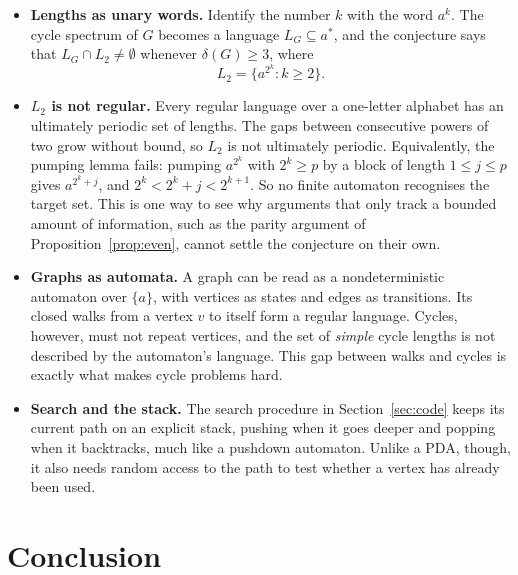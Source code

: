 \documentclass[11pt,a4paper]{article}
\theoremstyle{definition}
\begin{document}
\begin{itemize}[leftmargin=*]
  \item \textbf{Lengths as unary words.} Identify the number $k$ with the
        word $a^k$. The cycle spectrum of $G$ becomes a language
        $L_G\subseteq a^*$, and the conjecture says that
        $L_G\cap L_2\neq\emptyset$ whenever $\delta(G)\ge3$, where
        \[
          L_2=\{a^{2^k} : k\ge2\}.
        \]
  \item \textbf{$L_2$ is not regular.} Every regular language over a
        one-letter alphabet has an ultimately periodic set of lengths. The gaps
        between consecutive powers of two grow without bound, so $L_2$ is not
        ultimately periodic. Equivalently, the pumping lemma fails: pumping
        $a^{2^k}$ with $2^k\ge p$ by a block of length $1\le j\le p$ gives
        $a^{2^k+j}$, and $2^k<2^k+j<2^{k+1}$. So no finite automaton recognises
        the target set. This is one way to see why arguments that only track a
        bounded amount of information, such as the parity argument of
        Proposition~\ref{prop:even}, cannot settle the conjecture on their own.
  \item \textbf{Graphs as automata.} A graph can be read as a nondeterministic
        automaton over $\{a\}$, with vertices as states and edges as
        transitions. Its closed walks from a vertex $v$ to itself form a
        regular language. Cycles, however, must not repeat vertices, and the
        set of \emph{simple} cycle lengths is not described by the automaton's
        language. This gap between walks and cycles is exactly what makes cycle
        problems hard.
  \item \textbf{Search and the stack.} The search procedure in
        Section~\ref{sec:code} keeps its current path on an explicit stack,
        pushing when it goes deeper and popping when it backtracks, much like a
        pushdown automaton. Unlike a PDA, though, it also needs random access
        to the path to test whether a vertex has already been used.
\end{itemize}

\section{Conclusion}
\end{document}
